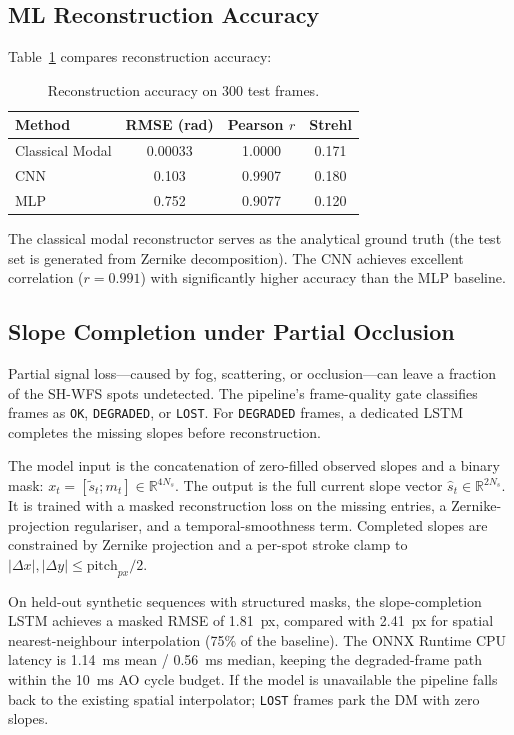 \documentclass[twocolumn,10pt]{IEEEtran}
\begin{document}
\subsection{ML Reconstruction Accuracy}
\label{sec:ml-acc}

Table~\ref{tab:ml-acc} compares reconstruction accuracy:

\begin{table}[H]
\centering
\caption{Reconstruction accuracy on 300 test frames.}
\label{tab:ml-acc}
\small
\begin{tabular}{lccc}
\toprule
Method & RMSE (rad) & Pearson $r$ & Strehl \\
\midrule
Classical Modal & 0.00033 & 1.0000 & 0.171 \\
CNN & 0.103 & 0.9907 & 0.180 \\
MLP & 0.752 & 0.9077 & 0.120 \\
\bottomrule
\end{tabular}
\end{table}

The classical modal reconstructor serves as the analytical ground truth (the test set is generated from Zernike decomposition). The CNN achieves excellent correlation ($r=0.991$) with significantly higher accuracy than the MLP baseline.

\subsection{Slope Completion under Partial Occlusion}
\label{sec:slope-completion}

Partial signal loss---caused by fog, scattering, or occlusion---can leave a
fraction of the SH-WFS spots undetected. The pipeline's frame-quality gate
classifies frames as \texttt{OK}, \texttt{DEGRADED}, or \texttt{LOST}. For
\texttt{DEGRADED} frames, a dedicated LSTM completes the missing slopes
before reconstruction.

The model input is the concatenation of zero-filled observed slopes and a
binary mask: $x_t = [\tilde{s}_t; m_t] \in \mathbb{R}^{4N_s}$. The output
is the full current slope vector $\hat{s}_t \in \mathbb{R}^{2N_s}$. It is
trained with a masked reconstruction loss on the missing entries, a
Zernike-projection regulariser, and a temporal-smoothness term. Completed
slopes are constrained by Zernike projection and a per-spot stroke clamp to
$|\Delta x|, |\Delta y| \le \text{pitch}_{px}/2$.

On held-out synthetic sequences with structured masks, the slope-completion
LSTM achieves a masked RMSE of 1.81~px, compared with 2.41~px for spatial
nearest-neighbour interpolation (75\% of the baseline). The ONNX Runtime CPU
latency is 1.14~ms mean / 0.56~ms median, keeping the degraded-frame path
within the 10~ms AO cycle budget. If the model is unavailable the pipeline
falls back to the existing spatial interpolator; \texttt{LOST} frames park
the DM with zero slopes.
\end{document}
